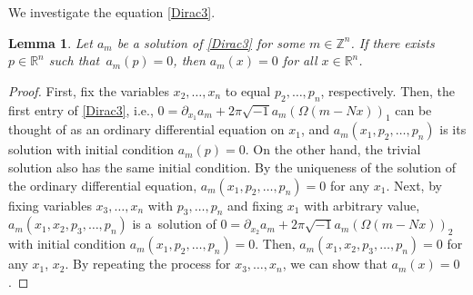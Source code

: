 \documentclass[10pt,a4paper]{amsart}
\numberwithin{equation}{section}
\newtheorem{Lemma}[Theorem]{Lemma}
\newcommand{\R}{\mathbb{R}}
\newcommand{\Z}{\mathbb{Z}}
\begin{document}
We investigate the equation \eqref{Dirac3}.
\begin{Lemma}
Let $a_m$ be a solution of \eqref{Dirac3} for some $m\in \Z^n$. If there exists $p\in \R^n$ such that~${a_m(p)=0}$, then $a_m(x)=0$ for all $x\in \R^n$.
\end{Lemma}
\begin{proof}
First, fix the variables $x_2, \ldots, x_n$ to equal $p_2, \ldots ,p_n$, respectively. Then, the first entry of \eqref{Dirac3}, i.e., $0=\partial_{x_1}a_m+2\pi\sqrt{-1}a_m(\Omega(m-Nx))_1$ can be thought of as an ordinary differential equation on $x_1$, and $a_m(x_1, p_2,\ldots ,p_n)$ is its solution with initial condition $a_m(p)=0$. On the other hand, the trivial solution also has the same initial condition. By the uniqueness of the solution of the ordinary differential equation, $a_m(x_1, p_2,\ldots ,p_n)=0$ for any $x_1$. Next, by fixing variables $x_3, \ldots, x_n$ with $p_3, \ldots ,p_n$ and fixing $x_1$ with arbitrary value, $a_m(x_1, x_2, p_3,\ldots ,p_n)$ is a~solution of $0=\partial_{x_2}a_m+2\pi\sqrt{-1}a_m(\Omega(m-Nx))_2$ with initial condition $a_m(x_1, p_2,\ldots ,p_n)=0$. Then, $a_m(x_1, x_2,p_3, \ldots ,p_n)=0$ for any $x_1$, $x_2$. By repeating the process for $x_3, \ldots ,x_n$, we can show that $a_m(x)=0$.
\end{proof}
\end{document}
